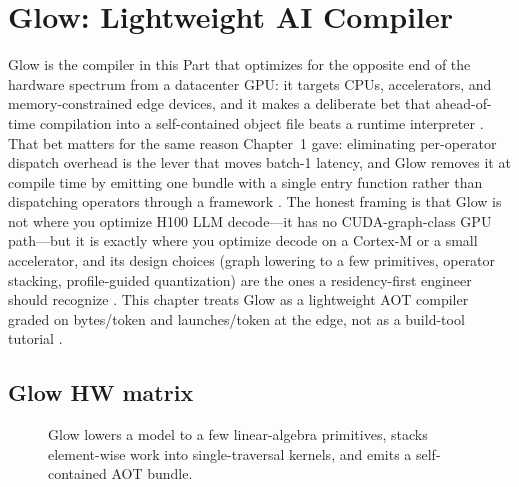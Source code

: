 \chapter{Glow: Lightweight AI Compiler}
\label{chap:ch19}

Glow is the compiler in this Part that optimizes for the opposite end of the hardware spectrum from a datacenter GPU: it targets CPUs, accelerators, and memory-constrained edge devices, and it makes a deliberate bet that ahead-of-time compilation into a self-contained object file beats a runtime interpreter \citep{rotem2018glow,pytorchglow2024}. That bet matters for the same reason Chapter~1 gave: eliminating per-operator dispatch overhead is the lever that moves batch-1 latency, and Glow removes it at compile time by emitting one bundle with a single entry function rather than dispatching operators through a framework \citep{taxbreak2026,patel2025llminference}.
The honest framing is that Glow is not where you optimize H100 LLM decode---it has no CUDA-graph-class GPU path---but it is exactly where you optimize decode on a Cortex-M or a small accelerator, and its design choices (graph lowering to a few primitives, operator stacking, profile-guided quantization) are the ones a residency-first engineer should recognize \citep{memoryfloor2026,dlbook}. This chapter treats Glow as a lightweight AOT compiler graded on bytes/token and launches/token at the edge, not as a build-tool tutorial \citep{nvidia2024cudagraphs}.

\section{Glow HW matrix}
\label{sec:ch19_glow_hw_matrix}


\begin{figure}[t]
\centering
{}
\caption{Glow lowers a model to a few linear-algebra primitives, stacks element-wise work into single-traversal kernels, and emits a self-contained AOT bundle.}
\label{fig:glow_hw_matrix_pipeline}
\end{figure}

